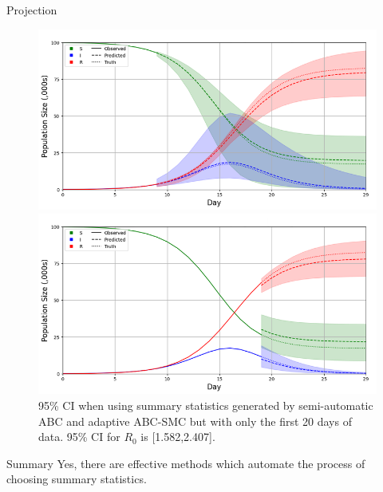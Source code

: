 \documentclass[aspectratio=169]{beamer}
\begin{document}
\begin{frame}{Projection}
  \begin{figure}[!htb]
    \centering
    \begin{minipage}{.5\textwidth}
        \centering\includegraphics[width=1\textwidth]{Semi_Auto_ABC_SMC_10_days_CI.png}
        \caption{95\% CI when using summary statistics generated by semi-automatic ABC and adaptive ABC-SMC but with only the first 10 days of data. 95\% CI for $R_0$ is [1.544,3.071].}
    \end{minipage}%
    \begin{minipage}{.5\textwidth}
        \centering\includegraphics[width=1\textwidth]{Semi_Auto_ABC_SMC_20_days_CI.png}
        \caption{95\% CI when using summary statistics generated by semi-automatic ABC and adaptive ABC-SMC but with only the first 20 days of data. 95\% CI for $R_0$ is [1.582,2.407].}
    \end{minipage}
  \end{figure}
\end{frame}

\begin{frame}[leftcolor=CoolGrey,rightcolor=UniversityRed,div=0.85\paperwidth]{Summary}
  Yes, there are effective methods which automate the process of choosing summary statistics.
\end{frame}
\end{document}
